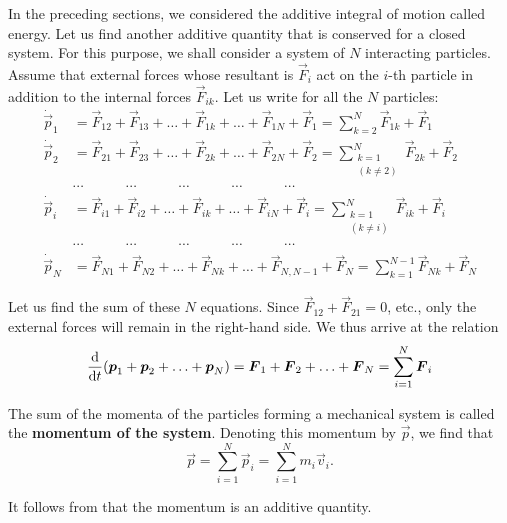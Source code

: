 In the preceding sections, we considered the additive integral of motion called energy. Let us find another additive quantity that is conserved for a closed system. For this purpose, we shall consider a system of $N$ interacting particles. Assume that external forces whose resultant is $\vec{F}_i$ act on the $i$-th particle in addition to the internal forces $\vec{F}_{ik}$. Let us write  for all the $N$ particles:
\begin{align*}
\dot{\vec{p}}_1 &= \vec{F}_{12} + \vec{F}_{13} + \ldots + \vec{F}_{1k} + \ldots + \vec{F}_{1N} + \vec{F}_{1} = \sum_{k=2}^{N} \vec{F}_{1k} + \vec{F}_{1}\\
\dot{\vec{p}}_2 &= \vec{F}_{21} + \vec{F}_{23} + \ldots + \vec{F}_{2k} + \ldots + \vec{F}_{2N} + \vec{F}_{2} = \sum_{\substack{k=1\\(k\neq 2)}}^{N} \vec{F}_{2k} + \vec{F}_{2}\\
&\cdots \quad\quad\quad\cdots \quad\quad\quad\cdots \quad\quad\quad\cdots \quad\quad\quad\cdots\\
\dot{\vec{p}}_i &= \vec{F}_{i1} + \vec{F}_{i2} + \ldots + \vec{F}_{ik} + \ldots + \vec{F}_{iN} + \vec{F}_{i} = \sum_{\substack{k=1\\(k\neq i)}}^{N} \vec{F}_{ik} + \vec{F}_{i}\\
&\cdots \quad\quad\quad\cdots \quad\quad\quad\cdots \quad\quad\quad\cdots \quad\quad\quad\cdots\\
\dot{\vec{p}}_N &= \vec{F}_{N1} + \vec{F}_{N2} + \ldots + \vec{F}_{Nk} + \ldots + \vec{F}_{N,N-1} + \vec{F}_{N} = \sum_{k=1}^{N-1} \vec{F}_{Nk} + \vec{F}_{N}
\end{align*}

Let us find the sum of these $N$ equations. Since $\vec{F}_{12}+\vec{F}_{21}=0$, etc., only the external forces will remain in the right-hand side. We thus arrive at the relation
\begin{equation}\label{eq:3_86}
\frac{\mathrm{d}}{\mathrm{d} t}(\boldsymbol{p}_1+\boldsymbol{p}_2+\ldots+\boldsymbol{p}_N) = \boldsymbol{F}_1+\boldsymbol{F}_2+\ldots+\boldsymbol{F}_N = \sum_{i=1}^{N} \boldsymbol{F}_i
\end{equation}

The sum of the momenta of the particles forming a mechanical system is called the \textbf{momentum of the system}. Denoting this momentum by $\vec{p}$, we find that
\begin{equation}\label{eq:3_87}
\vec{p} = \sum_{i=1}^{N} \vec{p}_i = \sum_{i=1}^{N} m_i\vec{v}_i.
\end{equation}

\noindent
It follows from  that the momentum is an additive quantity.

